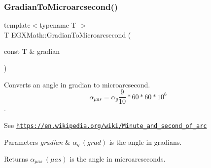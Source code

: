 \subsubsection{\texorpdfstring{Gradian\+To\+Microarcsecond()}{GradianToMicroarcsecond()}}
{\footnotesize\ttfamily template$<$typename T $>$ \\
T E\+G\+X\+Math\+::\+Gradian\+To\+Microarcsecond (\begin{DoxyParamCaption}\item[{const T \&}]{gradian }\end{DoxyParamCaption})}



Converts an angle in gradian to microarcsecond. \[\alpha_{\mu as}=\alpha_{g}\frac{9}{10} * 60 * 60 * 10^6\]. 

See \href{https://en.wikipedia.org/wiki/Minute_and_second_of_arc}{\tt https\+://en.\+wikipedia.\+org/wiki/\+Minute\+\_\+and\+\_\+second\+\_\+of\+\_\+arc} 
\begin{DoxyParams}{Parameters}
{\em gradian} & $\alpha_{g}\ (grad)$ is the angle in gradians. \\
\hline
\end{DoxyParams}
\begin{DoxyReturn}{Returns}
$\alpha_{\mu as}\ (\mu as)$ is the angle in microarcseconds. 
\end{DoxyReturn}

